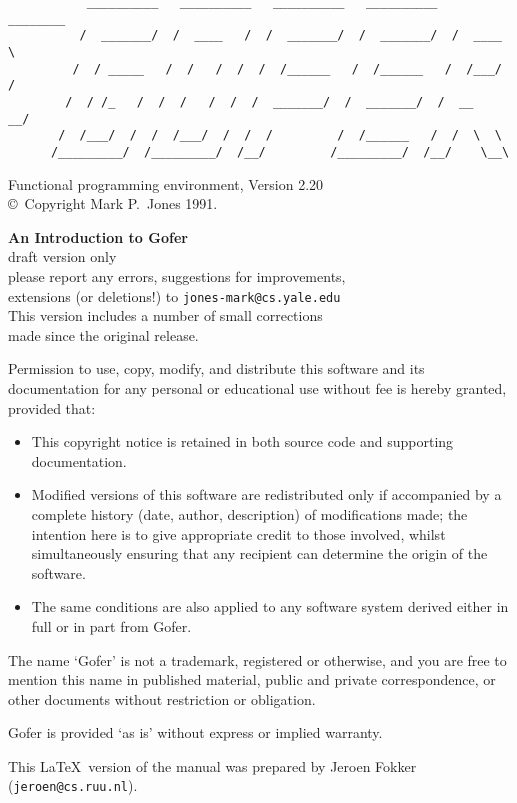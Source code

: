 {
\parskip=3pt
\parindent=0pt
\begin{verbatim}
           __________   __________   __________   __________   ________
          /  _______/  /  ____   /  /  _______/  /  _______/  /  ____  \
         /  / _____   /  /   /  /  /  /______   /  /______   /  /___/  /
        /  / /_   /  /  /   /  /  /  _______/  /  _______/  /  __   __/
       /  /___/  /  /  /___/  /  /  /         /  /______   /  /  \  \ 
      /_________/  /_________/  /__/         /_________/  /__/    \__\
\end{verbatim}
\begin{center}
Functional programming environment, Version 2.20\\
\copyright\ Copyright Mark P.\ Jones 1991.
\end{center}
\vspace{2cm}

\begin{center}
{\large\bf An Introduction to Gofer}\\
draft version only \\ 
please report any errors, suggestions for improvements, \\
extensions (or deletions!) to {\tt jones-mark@cs.yale.edu} \\[2em]
This version includes a number of small corrections \\
made since the original release.
\end{center}

\newpage

   Permission to use, copy, modify, and distribute this software and its
   documentation for any personal or educational use without fee is hereby
   granted, provided that:
\begin{itemize}
\item
   This copyright notice  is  retained  in  both  source  code  and
       supporting documentation.

\item
   Modified versions of this software are redistributed only if
       accompanied by a complete history (date, author, description) of
       modifications made; the intention here is to give appropriate
       credit to those involved, whilst simultaneously ensuring that any
       recipient can determine the origin of the software.

\item
   The same conditions are also applied to any software system
       derived either in full or in part from Gofer.
\end{itemize}

   The name `Gofer' is not a trademark, registered  or  otherwise,  and
   you are free to mention this name in published material, public  and
   private correspondence, or other documents  without  restriction  or
   obligation.

   Gofer is provided `as is' without express or implied warranty.

This \LaTeX\ version of the manual was prepared
by Jeroen Fokker ({\tt jeroen@cs.ruu.nl}).
}


